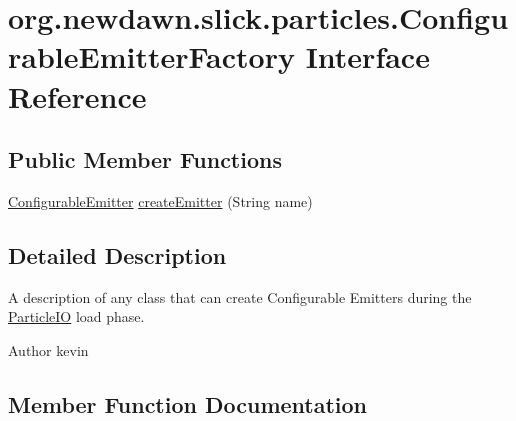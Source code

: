 \hypertarget{interfaceorg_1_1newdawn_1_1slick_1_1particles_1_1_configurable_emitter_factory}{}\section{org.\+newdawn.\+slick.\+particles.\+Configurable\+Emitter\+Factory Interface Reference}
\label{interfaceorg_1_1newdawn_1_1slick_1_1particles_1_1_configurable_emitter_factory}
\subsection*{Public Member Functions}
\begin{DoxyCompactItemize}
\item 
\mbox{\hyperlink{classorg_1_1newdawn_1_1slick_1_1particles_1_1_configurable_emitter}{Configurable\+Emitter}} \mbox{\hyperlink{interfaceorg_1_1newdawn_1_1slick_1_1particles_1_1_configurable_emitter_factory_a72bd5be4cf113516758028e08f344bdb}{create\+Emitter}} (String name)
\end{DoxyCompactItemize}


\subsection{Detailed Description}
A description of any class that can create Configurable Emitters during the \mbox{\hyperlink{classorg_1_1newdawn_1_1slick_1_1particles_1_1_particle_i_o}{Particle\+IO}} load phase.

\begin{DoxyAuthor}{Author}
kevin 
\end{DoxyAuthor}


\subsection{Member Function Documentation}
\mbox{\label{interfaceorg_1_1newdawn_1_1slick_1_1particles_1_1_configurable_emitter_factory_a72bd5be4cf113516758028e08f344bdb}} 
